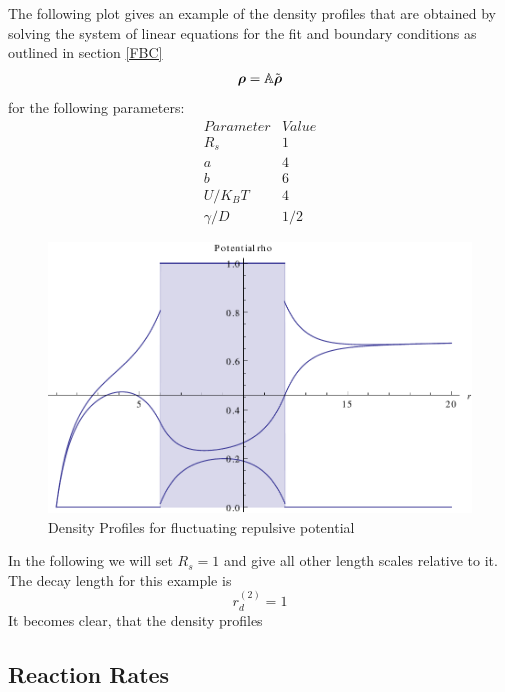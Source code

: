 The following plot gives an example of the density profiles that are obtained by solving the system of linear equations for the fit and boundary conditions as outlined in section \ref{FBC}
\begin{equation}
    \boldsymbol{\mathbf{\rho}} = \mathbb{A} \tilde{\boldsymbol{\mathbf{\rho}}}
\end{equation}
for the following parameters:
\begin{equation}
    \begin{array}{r|l}
        Parameter & Value \\ \hline
        R_s & 1 \\
        a   & 4 \\
        b   & 6 \\
        U/K_B T & 4 \\
        \gamma/D & 1/2
    \end{array} \nonumber
    \label{Parameters}
\end{equation}
\begin{figure}[H]
    \centering
    \includegraphics[width = .9 \textwidth]{plots/rho.pdf}
    \caption{Density Profiles for fluctuating repulsive potential}
    \label{fig:rho}
\end{figure}
In the following we will set $R_s = 1$ and give all other length scales relative to it.
\newpage
The decay length for this example is 
\begin{equation}
    r_d^{(2)} = 1
\end{equation}
It becomes clear, that the density profiles 
\subsection{Reaction Rates}

